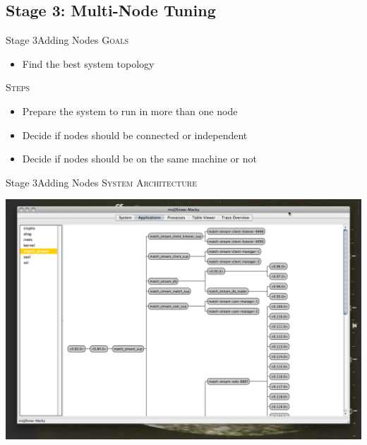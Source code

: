 \documentclass[utf8]{beamer}
\begin{document}
\subsection{Stage 3: Multi-Node Tuning}
\begin{frame}{Stage 3}{Adding Nodes}
	\textsc{Goals}
	\begin{itemize}
		\item Find the best system topology
	\end{itemize}
	\pause
	\textsc{Steps}
	\begin{itemize}
		\item Prepare the system to run in more than one node
		\item Decide if nodes should be connected or independent
		\item Decide if nodes should be on the same machine or not
	\end{itemize}
\end{frame}
\begin{frame}{Stage 3}{Adding Nodes}
	\textsc{System Architecture}
	\begin{center}
		\includegraphics[height=.75\textheight]{img/running-late.png}
	\end{center}
\end{frame}
\end{document}

